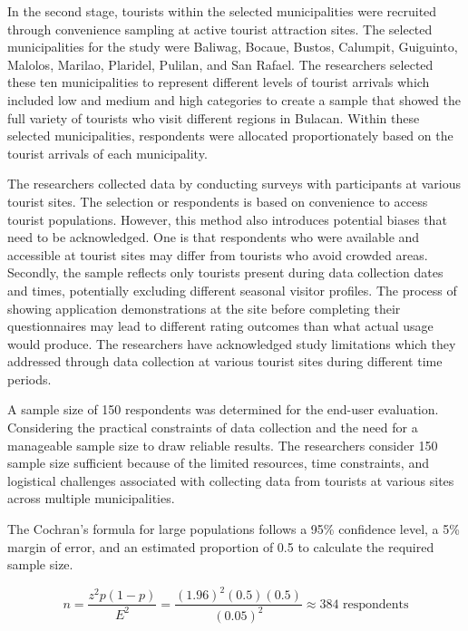 In the second stage, tourists within the selected municipalities were recruited through convenience sampling at active tourist attraction sites. The selected municipalities for the study were Baliwag, Bocaue, Bustos, Calumpit, Guiguinto, Malolos, Marilao, Plaridel, Pulilan, and San Rafael. The researchers selected these ten municipalities to represent different levels of tourist arrivals which included low and medium and high categories to create a sample that showed the full variety of tourists who visit different regions in Bulacan. Within these selected municipalities, respondents were allocated proportionately based on the tourist arrivals of each municipality. %

The researchers collected data by conducting surveys with participants at various tourist sites. The selection or respondents is based on convenience to access tourist populations. However, this method also introduces potential biases that need to be acknowledged. One is that respondents who were available and accessible at tourist sites may differ from tourists who avoid crowded areas. Secondly, the sample reflects only tourists present during data collection dates and times, potentially excluding different seasonal visitor profiles. The process of showing application demonstrations at the site before completing their questionnaires may lead to different rating outcomes than what actual usage would produce. The researchers have acknowledged study limitations which they addressed through data collection at various tourist sites during different time periods.

A sample size of 150 respondents was determined for the end-user evaluation. Considering the practical constraints of data collection and the need for a manageable sample size to draw reliable results. The researchers consider 150 sample size sufficient because of the limited resources, time constraints, and logistical challenges associated with collecting data from tourists at various sites across multiple municipalities. 

The Cochran’s formula for large populations follows a 95\% confidence level, a 5\% margin of error, and an estimated proportion of 0.5 to calculate the required sample size. 

\begin{equation}
	\label{cochran}
	n = \frac{z^2 p(1-p)}{E^2} = \frac{(1.96)^2 (0.5)(0.5)}{(0.05)^2} \approx 384 \text{ respondents}
\end{equation}

